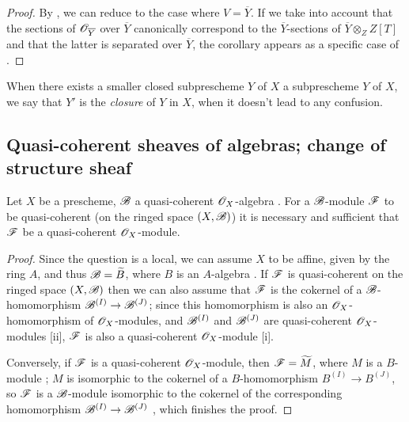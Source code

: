 \begin{proof}
\label{proof-1.9.5.11}
By , we can reduce to the case where $V=\overline{Y}$.
If we take into account that the sections of $\mathscr{O}_{\overline{Y}}$ over $\overline{Y}$ canonically correspond to the $\overline{Y}$-sections of $\overline{Y}\otimes_Z Z[T]$  and that the latter is separated over $\overline{Y}$, the corollary appears as a specific case of .
\end{proof}

When there exists a smaller closed subprescheme $Y$ of $X$  a subprescheme $Y$ of $X$, we say that $Y'$ is the \emph{closure} of $Y$ in $X$, when it doesn't lead to any confusion.

\subsection{Quasi-coherent sheaves of algebras; change of structure sheaf}
\label{subsection-qcoh-algs-and-change-of-str-sheaf}

\begin{prop}[9.6.1]
\label{1.9.6.1}
Let $X$ be a prescheme, $\mathscr{B}$ a quasi-coherent $\mathscr{O}_X$-algebra .
For a $\mathscr{B}$-module $\mathscr{F}$ to be quasi-coherent (on the ringed space $(X,\mathscr{B})$) it is necessary and sufficient that $\mathscr{F}$ be a quasi-coherent $\mathscr{O}_X$-module.
\end{prop}

\begin{proof}
\label{proof-1.9.6.1}
Since the question is a local, we can assume $X$ to be affine, given by the ring $A$, and thus $\mathscr{B}=\widetilde{B}$, where $B$ is an $A$-algebra .
If $\mathscr{F}$ is quasi-coherent on the ringed space $(X,\mathscr{B})$ then we can also assume that $\mathscr{F}$ is the cokernel of a $\mathscr{B}$-homomorphism $\sh{B}^{(I)}\to\sh{B}^{(J)}$; since this homomorphism is also an $\mathscr{O}_X$-homomorphism of $\mathscr{O}_X$-modules, and $\mathscr{B}^{(I)}$ and $\mathscr{B}^{(J)}$ are quasi-coherent $\mathscr{O}_X$-modules [ii], $\mathscr{F}$ is also a quasi-coherent $\mathscr{O}_X$-module [i].

Conversely, if $\mathscr{F}$ is a quasi-coherent $\mathscr{O}_X$-module, then $\mathscr{F}=\widetilde{M}$, where $M$ is a $B$-module ; $M$ is isomorphic to the cokernel of a $B$-homomorphism $B^{(I)}\to B^{(J)}$, so $\mathscr{F}$ is a $\mathscr{B}$-module isomorphic to the cokernel of the corresponding homomorphism $\sh{B}^{(I)}\to\sh{B}^{(J)}$ , which finishes the proof.
\end{proof}

